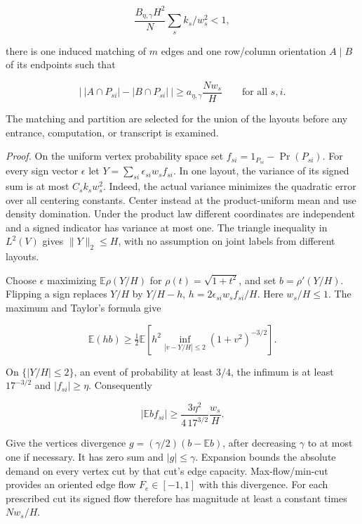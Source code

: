 \documentclass[
  11pt,
]{article}
\begin{document}
\[
 \frac{B_{\eta,\gamma}H^2}{N}\sum_s k_s/w_s^2<1 ,
 \tag{X.2}
\]

there is one induced matching of \(m\) edges and one row/column
orientation \(A\mid B\) of its endpoints such that

\[
  \left|\ |A\cap P_{si}|-|B\cap P_{si}|\ \right|
       \ge a_{\eta,\gamma}\frac{Nw_s}{H}
       \qquad\text{for all }s,i.                         \tag{X.3}
\]

The matching and partition are selected for the union of the layouts
before any entrance, computation, or transcript is examined.

\emph{Proof.} On the uniform vertex probability space set
\(f_{si}=1_{P_{si}}-\Pr(P_{si})\). For every sign vector \(\epsilon\)
let \(Y=\sum_{si}\epsilon_{si}w_s f_{si}\). In one layout, the variance
of its signed sum is at most \(C_sk_s w_s^2\). Indeed, the actual
variance minimizes the quadratic error over all centering constants.
Center instead at the product-uniform mean and use density domination.
Under the product law different coordinates are independent and a signed
indicator has variance at most one. The triangle inequality in
\(L^2(V)\) gives \(\|Y\|_2\le H\), with no assumption on joint labels
from different layouts.

Choose \(\epsilon\) maximizing \(\mathbb E\rho(Y/H)\) for
\(\rho(t)=\sqrt{1+t^2}\), and set \(b=\rho'(Y/H)\). Flipping a sign
replaces \(Y/H\) by \(Y/H-h\), \(h=2\epsilon_{si}w_sf_{si}/H\). Here
\(w_s/H\le1\). The maximum and Taylor's formula give

\[
 \mathbb E(hb)\ge\tfrac12\mathbb E\!\left[
 h^2\inf_{|v-Y/H|\le2}(1+v^2)^{-3/2}\right].
\]

On \(\{|Y/H|\le2\}\), an event of probability at least \(3/4\), the
infimum is at least \(17^{-3/2}\) and \(|f_{si}|\ge\eta\). Consequently

\[
 |\mathbb E b f_{si}|\ge \frac{3\eta^2}{4\,17^{3/2}}\frac{w_s}{H}.
 \tag{X.4}
\]

Give the vertices divergence \(g=(\gamma/2)(b-\mathbb E b)\), after
decreasing \(\gamma\) to at most one if necessary. It has zero sum and
\(|g|\le\gamma\). Expansion bounds the absolute demand on every vertex
cut by that cut's edge capacity. Max-flow/min-cut provides an oriented
edge flow \(F_e\in[-1,1]\) with this divergence. For each prescribed cut
its signed flow therefore has magnitude at least a constant times
\(Nw_s/H\).
\end{document}
